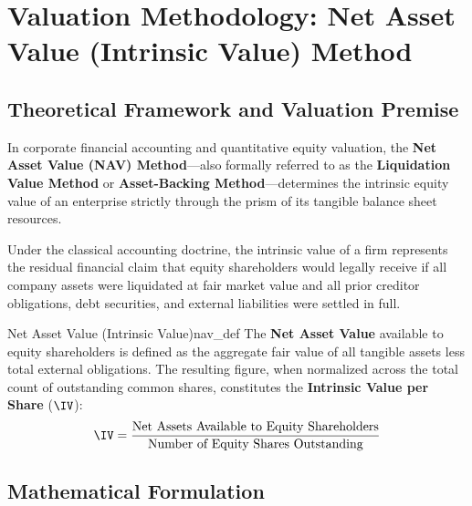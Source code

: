 
\section[Valuation Methodology]{Valuation Methodology: Net Asset Value (Intrinsic Value) Method}

\subsection{Theoretical Framework and Valuation Premise}
In corporate financial accounting and quantitative equity valuation, the \textbf{Net Asset Value (NAV) Method}---also formally referred to as the \textbf{Liquidation Value Method} or \textbf{Asset-Backing Method}---determines the intrinsic equity value of an enterprise strictly through the prism of its tangible balance sheet resources. 

Under the classical accounting doctrine, the intrinsic value of a firm represents the residual financial claim that equity shareholders would legally receive if all company assets were liquidated at fair market value and all prior creditor obligations, debt securities, and external liabilities were settled in full.

\begin{definition}{Net Asset Value (Intrinsic Value)}{nav_def}
The \textbf{Net Asset Value} available to equity shareholders is defined as the aggregate fair value of all tangible assets less total external obligations. The resulting figure, when normalized across the total count of outstanding common shares, constitutes the \textbf{Intrinsic Value per Share} ($\IV$):
\begin{equation}
    \IV = \frac{\text{Net Assets Available to Equity Shareholders}}{\text{Number of Equity Shares Outstanding}}
\end{equation}
\end{definition}

\subsection{Mathematical Formulation}

